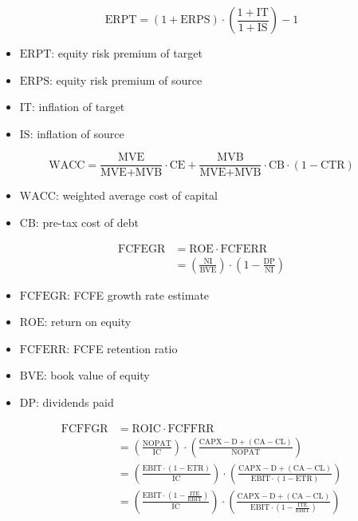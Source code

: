 $$
\text{ERPT} = (1 + \text{ERPS}) \cdot \left( \frac{1 + \text{IT}}{1 + \text{IS}} \right) - 1
$$

\begin{itemize}
  \item[] $\text{ERPT}$: equity risk premium of target
  \item[] $\text{ERPS}$: equity risk premium of source
  \item[] $\text{IT}$: inflation of target
  \item[] $\text{IS}$: inflation of source
\end{itemize}

$$
\text{WACC} = \frac{\text{MVE}}{\text{MVE} + \text{MVB}} \cdot \text{CE} + \frac{\text{MVB}}{\text{MVE} + \text{MVB}} \cdot \text{CB} \cdot (1 - \text{CTR})
$$

\begin{itemize}
  \item[] $\text{WACC}$: weighted average cost of capital
  \item[] $\text{CB}$: pre-tax cost of debt
\end{itemize}

$$
\begin{aligned}
\text{FCFEGR} &= \text{ROE} \cdot \text{FCFERR} \\
&= \left( \frac{\text{NI}}{\text{BVE}} \right) \cdot \left( 1 - \frac{\text{DP}}{\text{NI}} \right)
\end{aligned}
$$

\begin{itemize}
  \item[] $\text{FCFEGR}$: FCFE growth rate estimate
  \item[] $\text{ROE}$: return on equity
  \item[] $\text{FCFERR}$: FCFE retention ratio
  \item[] $\text{BVE}$: book value of equity 
  \item[] $\text{DP}$: dividends paid
\end{itemize}

$$
\begin{aligned}
\text{FCFFGR} &= \text{ROIC} \cdot \text{FCFFRR} \\
&= \left( \frac{\text{NOPAT}}{\text{IC}} \right) \cdot \left( \frac{\text{CAPX} - \text{D} + (\text{CA} - \text{CL})}{\text{NOPAT}} \right) \\
&= \left( \frac{\text{EBIT} \cdot (1 - \text{ETR})}{\text{IC}} \right) \cdot \left( \frac{\text{CAPX} - \text{D} + (\text{CA} - \text{CL})}{\text{EBIT} \cdot (1 - \text{ETR})} \right) \\
&= \left( \frac{\text{EBIT} \cdot \left(1 - \frac{\text{ITE}}{\text{EBIT}} \right)}{\text{IC}} \right) \cdot \left( \frac{\text{CAPX} - \text{D} + (\text{CA} - \text{CL})}{\text{EBIT} \cdot \left(1 - \frac{\text{ITE}}{\text{EBIT}} \right) } \right) \\
\end{aligned}
$$

